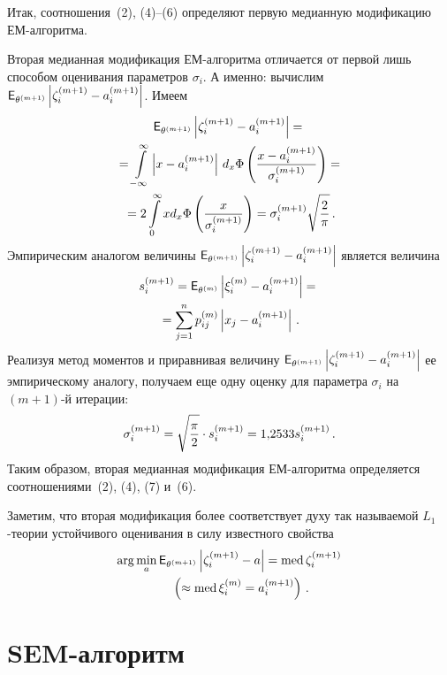 \begin{multicols}{2}
Итак, соотношения~(2), (4)--(6) определяют первую медианную
модификацию ЕМ-алгоритма.

Вторая медианная модификация ЕМ-ал\-го\-рит\-ма отличается от первой
лишь способом оценивания параметров $\sigma_i$. А именно: вычислим\linebreak
${\sf E}_{\theta^{(m+1)}}\left |\zeta_i^{(m+1)}-a_i^{(m+1)}\right|$.
Имеем
\begin{multline*}
{\sf E}_{\theta^{(m+1)}}\left |\zeta_i^{(m+1)}-
a_i^{(m+1)}\right |={}\\
{}=
\int\limits\limits_{-\infty}^{\infty}\left |x-a_i^{(m+1)}\right |\,d_x\Phi\left(
\displaystyle\frac{\displaystyle x-a_i^{(m+1)}\mathstrut}{\displaystyle \sigma_i^{(m+1)}\mathstrut}\right)={}
\\
{}=2\int\limits_{0}^{\infty}xd_x\Phi\left(\displaystyle\frac{\displaystyle x\mathstrut}{\displaystyle \sigma_i^{(m+1)}\mathstrut}\right)=\sigma_i^{(m+1)}\sqrt{\displaystyle\frac{\displaystyle 2\mathstrut}{\displaystyle \pi\mathstrut}}\,.
\end{multline*}
Эмпирическим аналогом величины\linebreak
${\sf E}_{\theta^{(m+1)}}\left|\zeta_i^{(m+1)}-a_i^{(m+1)}\right|$ является
величина
\begin{multline*}
s_i^{(m+1)}={\sf E}_{\theta^{(m)}}\left |\xi_i^{(m)}-a_i^{(m+1)}\right |={}\\
{}=
\sum\limits_{j=1}^np_{ij}^{(m)}\left |x_j-a_i^{(m+1)}\right |\,.
\end{multline*}
Реализуя метод моментов и приравнивая величину ${\sf
E}_{\theta^{(m+1)}}\left |\zeta_i^{(m+1)}-a_i^{(m+1)}\right |$ ее
эмпирическому аналогу, получаем еще одну оценку для параметра
$\sigma_i$ на $(m+1)$-й итерации:
\begin{equation}
\sigma_i^{(m+1)}=\sqrt{\displaystyle\frac{\displaystyle \pi\mathstrut}{\displaystyle 2\mathstrut}}\cdot s_i^{(m+1)}=1{,}2533 s_i^{(m+1)}\,.
\end{equation}
Таким образом, вторая медианная модификация ЕМ-алгоритма
определяется соотношениями~(2), (4), (7) и~(6).

Заметим, что вторая модификация более соответствует духу так
называемой $L_1$-теории устойчивого оценивания в силу
известного свойства
\begin{multline*}
\arg\min_{a}{\sf E}_{\theta^{(m+1)}}\left |\zeta_i^{(m+1)}-a\right |=
\mathrm{med}\,\zeta_i^{(m+1)}\\
\ \ \ \ \  \ \left( \approx \mathrm{med}\,\xi_i^{(m)}=a_i^{(m+1)}\right)\,.
\end{multline*}

\section{SEM-алгоритм}


\end{multicols}
